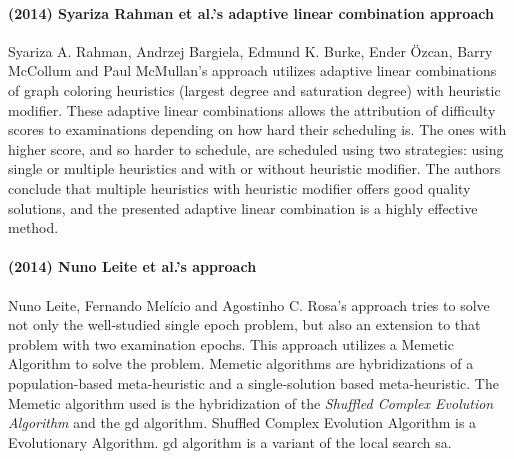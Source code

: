 \paragraph{(2014) Syariza Rahman et al.'s adaptive linear combination approach}
Syariza A. Rahman, Andrzej Bargiela, Edmund K. Burke, Ender Özcan, Barry McCollum and Paul McMullan's approach \cite{Rahman2014a} utilizes adaptive linear combinations of graph coloring heuristics (largest degree and saturation degree) with heuristic modifier. These adaptive linear combinations allows the attribution of difficulty scores to examinations depending on how hard their scheduling is. The ones with higher score, and so harder to schedule, are scheduled using two strategies: using single or multiple heuristics and with or without heuristic modifier. The authors conclude that multiple heuristics with heuristic modifier offers good quality solutions, and the presented adaptive linear combination is a highly effective method.\\

\paragraph{(2014) Nuno Leite et al.'s approach}
Nuno Leite, Fernando Melício and Agostinho C. Rosa's approach \cite{Leite2014} tries to solve not only the well-studied single epoch problem, but also an extension to that problem with two examination epochs. This approach utilizes a Memetic Algorithm to solve the problem. Memetic algorithms are hybridizations of a population-based meta-heuristic and a single-solution based meta-heuristic. The Memetic algorithm used is the hybridization of the \textit{Shuffled Complex Evolution Algorithm} and the \gls{gd} algorithm. Shuffled Complex Evolution Algorithm is a Evolutionary Algorithm. \gls{gd} algorithm is a variant of the local search \gls{sa}.\\

